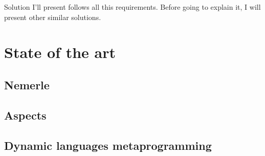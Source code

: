 Solution I'll present follows all this requirements.
Before going to explain it, I will present other similar solutions.



\section{State of the art}
\subsection{Nemerle}
\subsection{Aspects}
\subsection{Dynamic languages metaprogramming}
